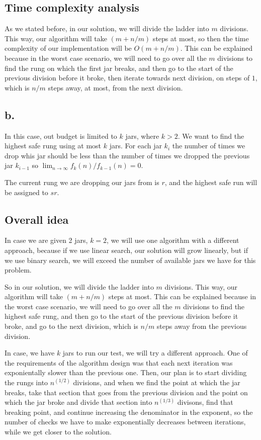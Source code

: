 \documentclass{article}
\begin{document}
\subsection*{Time complexity analysis}

As we stated before, in our solution, we will divide the ladder into $m$ divisions. This way, our algorithm will take $(m+n/m)$ steps at most, so then the time complexity of our implementation will be $O(m+n/m)$. This can be explained because in the worst case scenario, we will need to go over all the $m$ divisions to find the rung on which the first jar breaks, and then go to the start of the previous division before it broke, then iterate towards next division, on steps of $1$, which is $n/m$ steps away, at most, from the next division.

\subsection*{b.}

In this case, out budget is limited to $k$ jars, where $k>2$. We want to find the highest safe rung using at most $k$ jars. For each jar $k_i$ the number of times we drop whis jar should be less than the number of times we dropped the previous jar $k_{i-1}$ so $\lim_{n\to\infty} f_k(n)/f_{k-1}(n) = 0$.

The current rung we are dropping our jars from is $r$, and the highest safe run will be assigned to $sr$.

\subsection*{Overall idea}

In case we are given 2 jars, $k = 2$, we will use one algorithm with a different approach, because if we use linear search, our solution will grow linearly, but if we use binary search, we will exceed the number of available jars we have for this problem.

So in our solution, we will divide the ladder into $m$ divisions. This way, our algorithm will take $(m+n/m)$ steps at most. This can be explained because in the worst case scenario, we will need to go over all the $m$ divisions to find the highest safe rung, and then go to the start of the previous division before it broke, and go to the next division, which is $n/m$ steps away from the previous division.

In case, we have $k$ jars to run our test, we will try a different approach. One of the requirements of the algorithm design was that each next iteration was exponientally slower than the previous one. Then, our plan is to start dividing the rungs into $n^(1/2)$ divisions, and when we find the point at which the jar breaks, take that section that goes from the previous division and the point on which the jar broke and divide that section into $n^(1/3)$ divisons, find that breaking point, and continue increasing the denominator in the exponent, so the number of checks we have to make exponentially decreases between iterations, while we get closer to the solution. 
\end{document}
